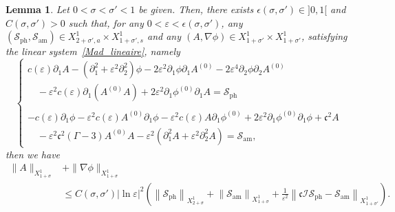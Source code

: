 \documentclass[10pt]{amsart}
\newtheorem{lemm}[theo]{Lemma}\newtheorem{prop}[theo]{Proposition}\newtheorem{coro}[theo]{Corollary}\newtheorem{conj}[theo]{Conjecture}
\theoremstyle{definition}\newtheorem{defi}[theo]{Definition}\newtheorem{rema}[theo]{Remark}\newtheorem{exam}[theo]{Example}\newtheorem{exem}[theo]{Example}\newtheorem{nota}[theo]{Notation}
\newcommand*\p{\partial}
\newcommand{\amm}{\mathrm{am}}
\newcommand{\phl}{\mathrm{ph}}
\newcommand*\BI{\mathcal{I}}
\newcommand*\BS{\mathcal{S}}
\newcommand*\cs{{\mathfrak c}}
\newcommand*\ls{\leqslant }
\newcommand*\e{\varepsilon}
\newcommand*\ep{\epsilon}
\newcommand*\lne{\lvert \ln \varepsilon \rvert}
\newcommand*\s{\sigma}
\begin{document}
\begin{lemm}\label{esti-apriori_plan}
Let $ 0 < \s < \s' < 1 $ be given. Then, there exists $ \ep (\s, \s') \in]0,1[$ and $ C (\s,\s') > 0 $ such that, for any $ 0 < \e < \ep(\s, \s') $, any $ (\BS_{\phl}, \BS_{\amm}) \in X^{1}_{2+\s', a} \times X^{1}_{1+\s', s} $ and any $ (A, \nabla \phi) \in X^{1}_{ 1+\s'} \times X^{1}_{ 1+ \s'} $, satisfying the linear system~\eqref{Mad_lineaire}, namely
\begin{equation*}
\left\{
\begin{array}{ll}
c(\e) \p_{1} A -\left(\p_{1}^2 + \e^2 \p^2_{2}\right) \phi - 2 \e^2 \p_{1} \phi \p_{1} A^{(0)} - 2 \e^4 \p_{2} \phi \p_{2} A^{(0)}
\\
\quad - \e^2 c(\e) \p_1 (A^{(0)} A) + 2 \e^2 \p_{1} \phi^{(0)} \p_{1} A = \BS_{\phl} \\ \ \\
- c(\e) \p_{1} \phi - \e^2 c(\e) A^{(0)} \p_1 \phi - \e^2 c(\e) A \p_1 \phi^{(0)} + 2 \e^2 \p_{1} \phi^{(0)} \p_{1} \phi + \cs^2 A
\\
\quad - \e^2 \cs^2 (\Gamma -3) A^{(0)} A - \e^2 \left(\p_{1}^2 A + \e^2 \p_{2}^2 A\right) = \BS_{\amm},
\end{array}\right.
\end{equation*}
then we have
\begin{align*}
\| A \|_{ X^1_{ 1+ \s} } & + \| \nabla \phi \|_{ X^1_{1+ \s} }
\\ & \ls C (\s, \s') \lne^2
\left(
\left\| \BS_{\phl} \right\|_{ X^{1}_{ 2+\s } } + \left\| \BS_{\amm} \right\|_{ X^{ 1}_{1+\s} } + \frac{1}{\e^2} \left\| \cs \BI \BS_{\phl} - \BS_{\amm} \right\|_{ X^{1}_{1+\s'}}
\right).
\end{align*}
\end{lemm}
\end{document}
